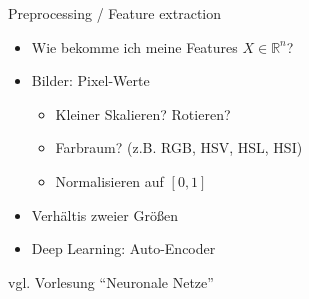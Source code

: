 \begin{frame}{Preprocessing / Feature extraction}
    \begin{itemize}
        \item Wie bekomme ich meine Features $X \in \mathbb{R}^n$?
        \item Bilder: Pixel-Werte
        \begin{itemize}
            \item Kleiner Skalieren? Rotieren?
            \item Farbraum? (z.B. RGB, HSV, HSL, HSI)
            \item Normalisieren auf $[0, 1]$
        \end{itemize}
        \item Verhältis zweier Größen
        \item Deep Learning: Auto-Encoder
    \end{itemize}

    vgl. Vorlesung \enquote{Neuronale Netze}
\end{frame}

